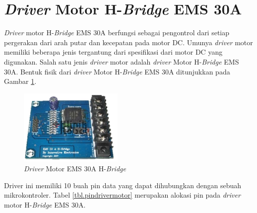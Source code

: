 \section{\textit{Driver} Motor H-\textit{Bridge} EMS 30A}
\textit{Driver} motor H-\textit{Bridge} EMS 30A berfungsi sebagai pengontrol dari setiap pergerakan dari arah putar dan kecepatan pada motor DC. Umunya \textit{driver} motor memiliki beberapa jenis tergantung dari spesifikasi dari motor DC yang digunakan. Salah satu jenis \textit{driver} motor adalah \textit{driver} Motor  H-\textit{Bridge} EMS 30A. Bentuk fisik dari \textit{driver} Motor H-\textit{Bridge} EMS 30A ditunjukkan pada Gambar \ref{pic.drivermotor}.
\begin{figure}[H]
	\centering
	\includegraphics[width=5cm]{gambar/driver_motor.jpg}
	\caption{\textit{Driver} Motor EMS 30A H-\textit{Bridge}}
	\label{pic.drivermotor}
\end{figure}

Driver ini memiliki 10 buah pin data yang dapat dihubungkan dengan sebuah mikrokontroler. Tabel \ref{tbl.pindrivermotor} merupakan alokasi pin pada \textit{driver} motor H-\textit{Bridge} EMS 30A.

